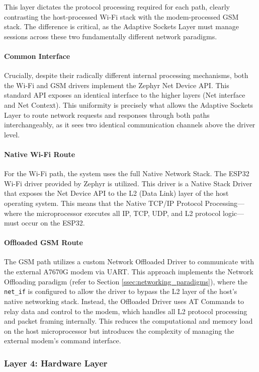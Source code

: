 This layer dictates the protocol processing required for each path, clearly contrasting the host-processed Wi-Fi stack with the modem-processed GSM stack. The difference is critical, as the Adaptive Sockets Layer must manage sessions across these two fundamentally different network paradigms.

\paragraph{Common Interface}
Crucially, despite their radically different internal processing mechanisms, both the Wi-Fi and GSM drivers implement the Zephyr Net Device API. This standard API exposes an identical interface to the higher layers (Net interface and Net Context). This uniformity is precisely what allows the Adaptive Sockets Layer to route network requests and responses through both paths interchangeably, as it sees two identical communication channels above the driver level.

\paragraph{Native Wi-Fi Route}
For the Wi-Fi path, the system uses the full Native Network Stack. The ESP32 Wi-Fi driver provided by Zephyr is utilized. This driver is a Native Stack Driver that exposes the Net Device API to the L2 (Data Link) layer of the host operating system. This means that the Native TCP/IP Protocol Processing—where the microprocessor executes all IP, TCP, UDP, and L2 protocol logic—must occur on the ESP32.

\paragraph{Offloaded GSM Route}
The GSM path utilizes a custom Network Offloaded Driver to communicate with the external A7670G modem via UART. This approach implements the Network Offloading paradigm (refer to Section \ref{ssec:networking_paradigms}), where the \texttt{net\_if} is configured to allow the driver to bypass the L2 layer of the host's native networking stack. Instead, the Offloaded Driver uses AT Commands to relay data and control to the modem, which handles all L2 protocol processing and packet framing internally. This reduces the computational and memory load on the host microprocessor but introduces the complexity of managing the external modem's command interface.

\subsubsection{Layer 4: Hardware Layer}
\label{sssec:hardware_layer}

